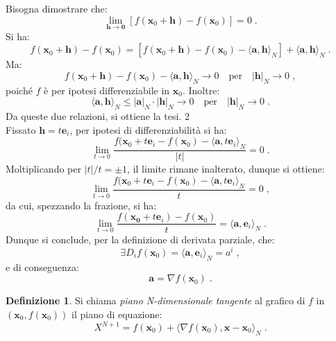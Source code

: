 \documentclass[a4paper,12pt]{report}
\theoremstyle{plain}
\theoremstyle{definition}
\newtheorem{defn}{Definizione}[section]
\theoremstyle{remark}
\numberwithin{equation}{section}
\begin{document}
Bisogna dimostrare che:
\begin{equation}
\lim_{\mathbf{h}\to \mathbf{0}} [f(\mathbf{x}_0+\mathbf{h})-f(\mathbf{x}_0)]=0\;.
\end{equation}
Si ha:
\begin{equation}
f(\mathbf{x}_0+\mathbf{h})-f(\mathbf{x}_0) = [f(\mathbf{x}_0+\mathbf{h})-f(\mathbf{x}_0) - \langle \mathbf{a},\mathbf{h}\rangle_N]+
\langle \mathbf{a},\mathbf{h}\rangle_N\;.
\end{equation}
Ma:
\begin{equation}
f(\mathbf{x}_0+\mathbf{h})-f(\mathbf{x}_0) - \langle \mathbf{a},\mathbf{h}\rangle_N \to 0\quad\mbox{per}\quad |\mathbf{h}|_N \to 0\;,
\end{equation}
poiché $f$ è per ipotesi differenziabile in $\mathbf{x}_0$. Inoltre:
\begin{equation}
\langle \mathbf{a},\mathbf{h}\rangle_N \le |\mathbf{a}|_N \cdot |\mathbf{h}|_N \to 0\quad \mbox{per}\quad |\mathbf{h}|_N \to 0\;.
\end{equation}
Da queste due relazioni, si ottiene la tesi.
\endproof
\proof $2$ \\
Fissato $\mathbf{h}=t\mathbf{e}_i$, per ipotesi di differenziabilità si ha:
\begin{equation}
\lim_{t \to 0} \frac{f(\mathbf{x}_0+t\mathbf{e}_i-f(\mathbf{x}_0)-\langle \mathbf{a},t\mathbf{e}_i\rangle_N}{|t|} =0\;.
\end{equation}
Moltiplicando per $|t|/t=\pm 1$, il limite rimane inalterato, dunque si ottiene:
\begin{equation}
\lim_{t \to 0} \frac{f(\mathbf{x}_0+t\mathbf{e}_i-f(\mathbf{x}_0)-\langle \mathbf{a},t\mathbf{e}_i\rangle_N}{t} =0\;,
\end{equation}
da cui, spezzando la frazione, si ha:
\begin{equation}
\lim_{t \to 0} \frac{f(\mathbf{x_0}+t\mathbf{e}_i)-f(\mathbf{x}_0)}{t}=\langle \mathbf{a},\mathbf{e}_i\rangle_N\;.
\end{equation}
Dunque si conclude, per la definizione di derivata parziale, che:
\begin{equation}
\exists D_i f(\mathbf{x}_0)=\langle \mathbf{a},\mathbf{e}_i \rangle_N = a^i\;,
\end{equation}
e di conseguenza:
\begin{equation}
\mathbf{a} = \nabla f(\mathbf{x}_0)\;.
\end{equation}
\endproof
\begin{defn} Si chiama \textit{piano N-dimensionale tangente} al grafico di $f$ in $(\mathbf{x}_0,f(\mathbf{x}_0))$ il piano di equazione:
\begin{equation}
X^{N+1}=f(\mathbf{x}_0)+\langle \nabla f(\mathbf{x}_0),\mathbf{x}-\mathbf{x}_0 \rangle_N\;.
\end{equation}
\end{defn}
\end{document}
